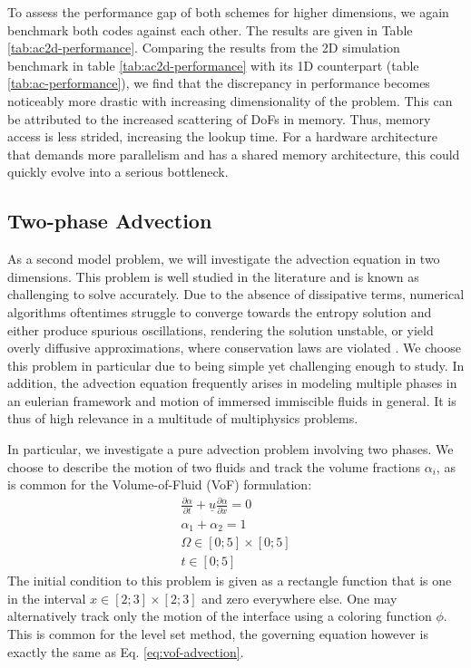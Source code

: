 \documentclass[sn-mathphys,Numbered]{sn-jnl}%
\theoremstyle{thmstyleone}%
\theoremstyle{thmstyletwo}%
\theoremstyle{thmstylethree}%
\begin{document}
To assess the performance gap of both schemes for higher dimensions, we again benchmark both codes against each other.
The results are given in Table \ref{tab:ac2d-performance}.
Comparing the results from the 2D simulation benchmark in table \ref{tab:ac2d-performance} with its 1D counterpart (table \ref{tab:ac-performance}), we find that the discrepancy in performance becomes noticeably more drastic with increasing dimensionality of the problem.
This can be attributed to the increased scattering of DoFs in memory.
Thus, memory access is less strided, increasing the lookup time.
For a hardware architecture that demands more parallelism and has a shared memory architecture, this could quickly evolve into a serious bottleneck.

\subsection{Two-phase Advection}\label{sec:advection-equation}

As a second model problem, we will investigate the advection equation in two dimensions.
This problem is well studied in the literature and is known as challenging to solve accurately.
Due to the absence of dissipative terms, numerical algorithms oftentimes struggle to converge towards the entropy solution and either produce spurious oscillations, rendering the solution unstable, or yield overly diffusive approximations, where conservation laws are violated \cite{levequeNumericalMethodsConservation1992}.
We choose this problem in particular due to being simple yet challenging enough to study.
In addition, the advection equation frequently arises in modeling multiple phases in an eulerian framework and motion of immersed immiscible fluids in general.
It is thus of high relevance in a multitude of multiphysics problems.

In particular, we investigate a pure advection problem involving two phases. 
We choose to describe the motion of two fluids and track the volume fractions $\alpha_i$, as is common for the Volume-of-Fluid (VoF) formulation:
\begin{align}
    \frac{\partial \alpha}{\partial t} + \underline{u} \frac{\partial \alpha}{\partial x} = 0  \label{eq:vof-advection}\\
    \alpha_1 + \alpha_2 = 1 \label{eq:vof-sum} \\
    \Omega \in \left[0;5\right] \times \left[0;5\right] \\
    t \in \left[0;5\right]
\end{align}
The initial condition to this problem is given as a rectangle function that is one in the interval $x \in \left[2;3\right] \times \left[2;3\right]$ and zero everywhere else.
One may alternatively track only the motion of the interface using a coloring function $\phi$. 
This is common for the level set method, the governing equation however is exactly the same as Eq. \ref{eq:vof-advection}.
\end{document}
